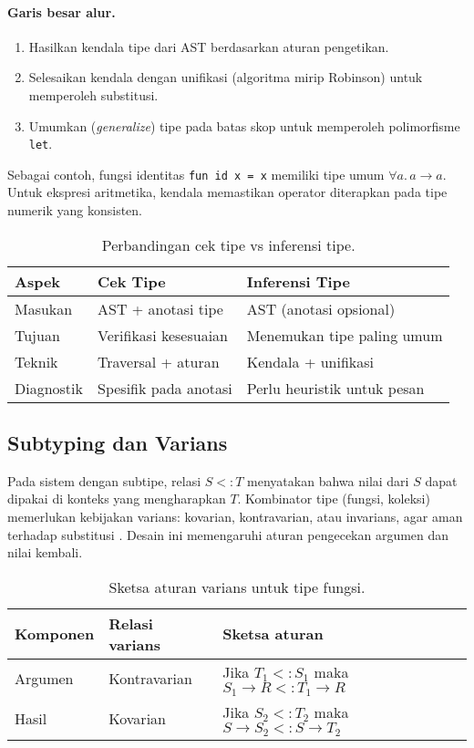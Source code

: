 \documentclass[../main.tex]{subfiles}
\begin{document}
\paragraph{Garis besar alur.}
\begin{enumerate}
  \item Hasilkan kendala tipe dari AST berdasarkan aturan pengetikan.
  \item Selesaikan kendala dengan unifikasi (algoritma mirip Robinson) untuk memperoleh substitusi.
  \item Umumkan (\emph{generalize}) tipe pada batas skop untuk memperoleh polimorfisme \texttt{let}.
\end{enumerate}

Sebagai contoh, fungsi identitas \texttt{fun id x = x} memiliki tipe umum $\forall a.\, a \to a$. Untuk ekspresi aritmetika, kendala memastikan operator diterapkan pada tipe numerik yang konsisten.

\begin{table}[t]
  \centering
  \caption{Perbandingan cek tipe vs inferensi tipe.}
  \label{tab:check-vs-infer}
  \begin{tabular}{@{}lll@{}}
    \toprule
    \textbf{Aspek} & \textbf{Cek Tipe} & \textbf{Inferensi Tipe} \\
    \midrule
    Masukan & AST + anotasi tipe & AST (anotasi opsional) \\
    Tujuan & Verifikasi kesesuaian & Menemukan tipe paling umum \\
    Teknik & Traversal + aturan & Kendala + unifikasi \\
    Diagnostik & Spesifik pada anotasi & Perlu heuristik untuk pesan \\
    \bottomrule
  \end{tabular}
\end{table}

\subsection{Subtyping dan Varians}
Pada sistem dengan subtipe, relasi $S <: T$ menyatakan bahwa nilai dari $S$ dapat dipakai di konteks yang mengharapkan $T$. Kombinator tipe (fungsi, koleksi) memerlukan kebijakan varians: kovarian, kontravarian, atau invarians, agar aman terhadap substitusi \citep{WikiSubtyping,WikiVariance}. Desain ini memengaruhi aturan pengecekan argumen dan nilai kembali.

\begin{table}[t]
  \centering
  \caption{Sketsa aturan varians untuk tipe fungsi.}
  \label{tab:variance}
  \begin{tabular}{@{}lll@{}}
    \toprule
    Komponen & Relasi varians & Sketsa aturan \\
    \midrule
    Argumen & Kontravarian & Jika $T_1 <: S_1$ maka $S_1 \to R <: T_1 \to R$ \\
    Hasil   & Kovarian     & Jika $S_2 <: T_2$ maka $S \to S_2 <: S \to T_2$ \\
    \bottomrule
  \end{tabular}
\end{table}
\end{document}
